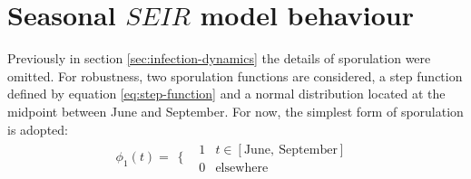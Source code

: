
\section{Seasonal $SEIR$ model behaviour}

Previously in section \ref{sec:infection-dynamics} the details of sporulation were omitted. For robustness, two sporulation functions are considered, a step function defined by equation \ref{eq:step-function} and a normal distribution located at the midpoint between June and September. For now, the simplest form of sporulation is adopted: %
\begin{equation}
\label{eq:step-function}
\phi_1(t) = 
\begin{array}{cc}
  \{ & 
    \begin{array}{cc}
      1 & t\in [\mathrm{June},\ \mathrm{September}] \\
      0 &  \mathrm{elsewhere}
    \end{array}
\end{array}
\end{equation}

